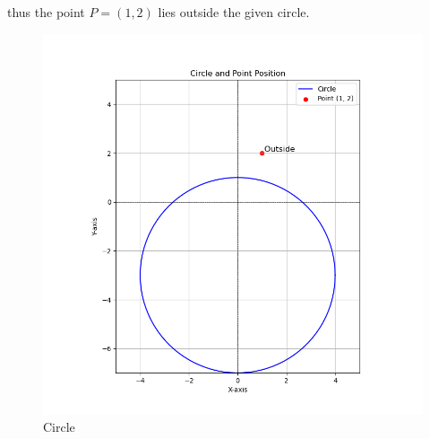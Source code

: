 \documentclass[journal]{IEEEtran}
\begin{document}
thus the point \( P = (1, 2) \) lies outside the given circle.

\begin{figure}[h!]
	\centering
	\includegraphics[width=0.7\linewidth]{figure/Figure_1.png} %
	\caption{Circle}
\end{figure}
\end{document}

